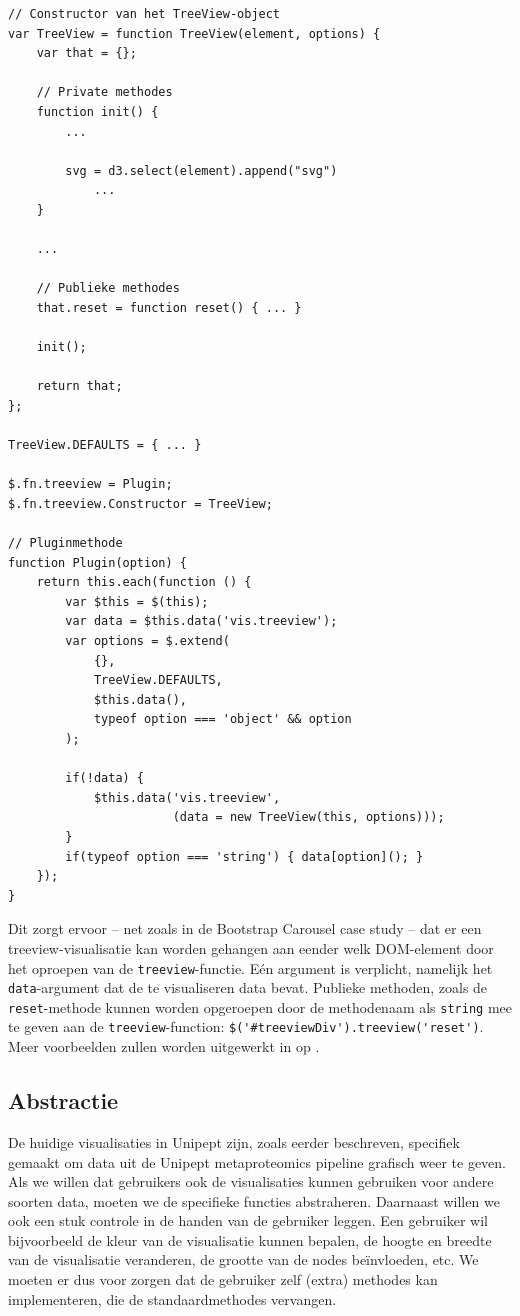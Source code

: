 \begin{lstlisting}[caption=(Ingekorte) code van de Unipept Treeview plugin,
label=lst:unipepttreeviewplugin]
// Constructor van het TreeView-object
var TreeView = function TreeView(element, options) {
    var that = {};

    // Private methodes
    function init() {
        ...
        
        svg = d3.select(element).append("svg")
            ...
    }
    
    ...
    
    // Publieke methodes
    that.reset = function reset() { ... }
    
    init();
    
    return that;
};

TreeView.DEFAULTS = { ... }

$.fn.treeview = Plugin;
$.fn.treeview.Constructor = TreeView;

// Pluginmethode
function Plugin(option) {
    return this.each(function () {
        var $this = $(this);
        var data = $this.data('vis.treeview');
        var options = $.extend(
            {}, 
            TreeView.DEFAULTS, 
            $this.data(), 
            typeof option === 'object' && option
        );

        if(!data) { 
            $this.data('vis.treeview', 
                       (data = new TreeView(this, options))); 
        }
        if(typeof option === 'string') { data[option](); }
    });   
}
\end{lstlisting}

Dit zorgt ervoor -- net zoals in de Bootstrap Carousel case study -- dat 
er een
treeview-visualisatie kan worden gehangen aan eender welk DOM-element door het
oproepen van de \texttt{treeview}-functie. Eén argument is verplicht, namelijk
het \texttt{data}-argument dat de te visualiseren data bevat. Publieke 
methoden, zoals de \texttt{reset}-methode kunnen worden opgeroepen door de 
methodenaam als \texttt{string} mee te geven aan de \texttt{treeview}-function: 
\lstinline|$('#treeviewDiv').treeview('reset')|. Meer voorbeelden zullen 
worden uitgewerkt in  op .

\subsection{Abstractie}
De huidige visualisaties in Unipept zijn, zoals eerder beschreven, specifiek
gemaakt om data uit de Unipept metaproteomics pipeline grafisch weer te geven.
Als we willen dat gebruikers ook de visualisaties kunnen gebruiken voor andere
soorten data, moeten we de specifieke functies abstraheren. Daarnaast willen we
ook een stuk controle in de handen van de gebruiker leggen. Een gebruiker wil
bijvoorbeeld de kleur van de visualisatie kunnen bepalen, de hoogte en breedte
van de visualisatie veranderen, de grootte van de nodes beïnvloeden, etc. We
moeten er dus voor zorgen dat de gebruiker zelf (extra) methodes kan
implementeren, die de standaardmethodes vervangen.

